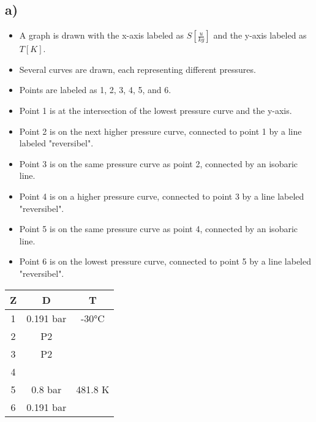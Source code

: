 

\subsection*{a)}

\begin{itemize}
    \item A graph is drawn with the x-axis labeled as $S \left[ \frac{u}{kg} \right]$ and the y-axis labeled as $T \left[ K \right]$.
    \item Several curves are drawn, each representing different pressures.
    \item Points are labeled as 1, 2, 3, 4, 5, and 6.
    \item Point 1 is at the intersection of the lowest pressure curve and the y-axis.
    \item Point 2 is on the next higher pressure curve, connected to point 1 by a line labeled "reversibel".
    \item Point 3 is on the same pressure curve as point 2, connected by an isobaric line.
    \item Point 4 is on a higher pressure curve, connected to point 3 by a line labeled "reversibel".
    \item Point 5 is on the same pressure curve as point 4, connected by an isobaric line.
    \item Point 6 is on the lowest pressure curve, connected to point 5 by a line labeled "reversibel".
\end{itemize}

\begin{tabular}{|c|c|c|}
    \hline
    Z & D & T \\
    \hline
    1 & 0.191 bar & -30°C \\
    2 & P2 & \\
    3 & P2 & \\
    4 & & \\
    5 & 0.8 bar & 481.8 K \\
    6 & 0.191 bar & \\
    \hline
\end{tabular}